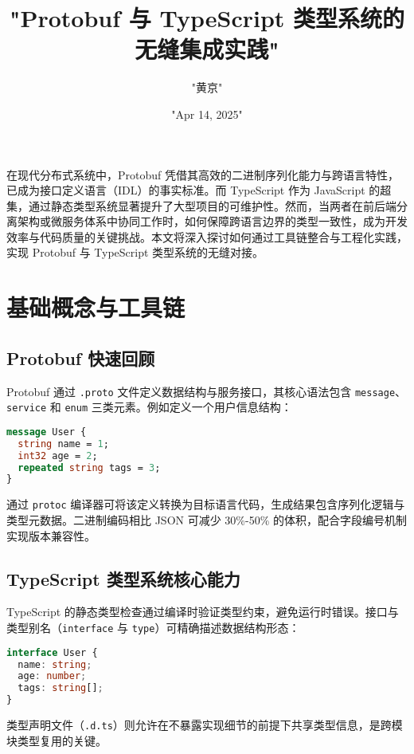 \title{"Protobuf 与 TypeScript 类型系统的无缝集成实践"}
\author{"黄京"}
\date{"Apr 14, 2025"}
\maketitle
在现代分布式系统中，Protobuf 凭借其高效的二进制序列化能力与跨语言特性，已成为接口定义语言（IDL）的事实标准。而 TypeScript 作为 JavaScript 的超集，通过静态类型系统显著提升了大型项目的可维护性。然而，当两者在前后端分离架构或微服务体系中协同工作时，如何保障跨语言边界的类型一致性，成为开发效率与代码质量的关键挑战。本文将深入探讨如何通过工具链整合与工程化实践，实现 Protobuf 与 TypeScript 类型系统的无缝对接。\par
\chapter{基础概念与工具链}
\section{Protobuf 快速回顾}
Protobuf 通过 \verb!.proto! 文件定义数据结构与服务接口，其核心语法包含 \verb!message!、\verb!service! 和 \verb!enum! 三类元素。例如定义一个用户信息结构：\par
\begin{lstlisting}[language=protobuf]
message User {
  string name = 1;
  int32 age = 2;
  repeated string tags = 3;
}
\end{lstlisting}
通过 \verb!protoc! 编译器可将该定义转换为目标语言代码，生成结果包含序列化逻辑与类型元数据。二进制编码相比 JSON 可减少 30\%{}-50\%{} 的体积，配合字段编号机制实现版本兼容性。\par
\section{TypeScript 类型系统核心能力}
TypeScript 的静态类型检查通过编译时验证类型约束，避免运行时错误。接口与类型别名（\verb!interface! 与 \verb!type!）可精确描述数据结构形态：\par
\begin{lstlisting}[language=typescript]
interface User {
  name: string;
  age: number;
  tags: string[];
}
\end{lstlisting}
类型声明文件（\verb!.d.ts!）则允许在不暴露实现细节的前提下共享类型信息，是跨模块类型复用的关键。\par
